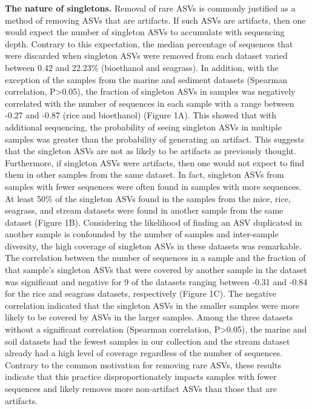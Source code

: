 \documentclass[
]{article}
\begin{document}
\textbf{The nature of singletons.} Removal of rare ASVs is commonly
justified as a method of removing ASVs that are artifacts. If such ASVs
are artifacts, then one would expect the number of singleton ASVs to
accumulate with sequencing depth. Contrary to this expectation, the
median percentage of sequences that were discarded when singleton ASVs
were removed from each dataset varied between 0.42 and 22.23\%
(bioethanol and seagrass). In addition, with the exception of the
samples from the marine and sediment datasets (Spearman correlation,
P\textgreater0.05), the fraction of singleton ASVs in samples was
negatively correlated with the number of sequences in each sample with a
range between -0.27 and -0.87 (rice and bioethanol) (Figure 1A). This
showed that with additional sequencing, the probability of seeing
singleton ASVs in multiple samples was greater than the probability of
generating an artifact. This suggests that the singleton ASVs are not as
likely to be artifacts as previously thought. Furthermore, if singleton
ASVs were artifacts, then one would not expect to find them in other
samples from the same dataset. In fact, singleton ASVs from samples with
fewer sequences were often found in samples with more sequences. At
least 50\% of the singleton ASVs found in the samples from the mice,
rice, seagrass, and stream datasets were found in another sample from
the same dataset (Figure 1B). Considering the likelihood of finding an
ASV duplicated in another sample is confounded by the number of samples
and inter-sample diversity, the high coverage of singleton ASVs in these
datasets was remarkable. The correlation between the number of sequences
in a sample and the fraction of that sample's singleton ASVs that were
covered by another sample in the dataset was significant and negative
for 9 of the datasets ranging between -0.31 and -0.84 for the rice and
seagrass datasets, respectively (Figure 1C). The negative correlation
indicated that the singleton ASVs in the smaller samples were more
likely to be covered by ASVs in the larger samples. Among the three
datasets without a significant correlation (Spearman correlation,
P\textgreater0.05), the marine and soil datasets had the fewest samples
in our collection and the stream dataset already had a high level of
coverage regardless of the number of sequences. Contrary to the common
motivation for removing rare ASVs, these results indicate that this
practice disproportionately impacts samples with fewer sequences and
likely removes more non-artifact ASVs than those that are artifacts.
\end{document}
